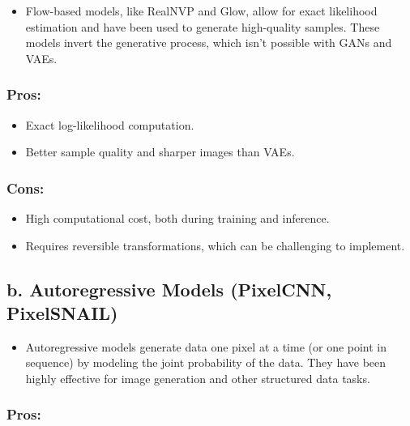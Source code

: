\documentclass[
]{book}
\providecommand{\tightlist}{%
  \setlength{\itemsep}{0pt}\setlength{\parskip}{0pt}}
\begin{document}
\begin{itemize}
\tightlist
\item
  Flow-based models, like RealNVP and Glow, allow for exact likelihood estimation and have been used to generate high-quality samples. These models invert the generative process, which isn't possible with GANs and VAEs.
\end{itemize}

\subsubsection{Pros:}\label{pros-7}

\begin{itemize}
\tightlist
\item
  Exact log-likelihood computation.
\item
  Better sample quality and sharper images than VAEs.
\end{itemize}

\subsubsection{Cons:}\label{cons-7}

\begin{itemize}
\tightlist
\item
  High computational cost, both during training and inference.
\item
  Requires reversible transformations, which can be challenging to implement.
\end{itemize}

\subsection{b. Autoregressive Models (PixelCNN, PixelSNAIL)}\label{b.-autoregressive-models-pixelcnn-pixelsnail}

\begin{itemize}
\tightlist
\item
  Autoregressive models generate data one pixel at a time (or one point in sequence) by modeling the joint probability of the data. They have been highly effective for image generation and other structured data tasks.
\end{itemize}

\subsubsection{Pros:}\label{pros-8}
\end{document}
